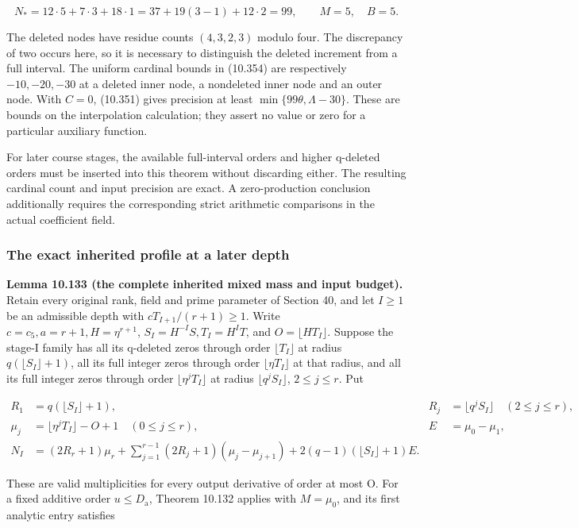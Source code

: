 \documentclass[
  11pt,
  a4paper,
]{article}
\begin{document}
\[
N_*=12\cdot5+7\cdot3+18\cdot1
=37+19(3-1)+12\cdot2=99,\qquad M=5,\quad B=5.
\tag{10.355}
\]

The deleted nodes have residue counts \((4,3,2,3)\) modulo four. The
discrepancy of two occurs here, so it is necessary to distinguish the
deleted increment from a full interval. The uniform cardinal bounds in
(10.354) are respectively \(-10,-20,-30\) at a deleted inner node, a
nondeleted inner node and an outer node. With \(C=0\), (10.351) gives
precision at least \(\min\{99\theta,\Lambda-30\}\). These are bounds on
the interpolation calculation; they assert no value or zero for a
particular auxiliary function.

For later course stages, the available full-interval orders and higher
q-deleted orders must be inserted into this theorem without discarding
either. The resulting cardinal count and input precision are exact. A
zero-production conclusion additionally requires the corresponding
strict arithmetic comparisons in the actual coefficient field.

\subsubsection{The exact inherited profile at a later
depth}\label{the-exact-inherited-profile-at-a-later-depth}

\textbf{Lemma 10.133 (the complete inherited mixed mass and input
budget).} Retain every original rank, field and prime parameter of
Section 40, and let \(I\ge1\) be an admissible depth with
\(cT_{I+1}/(r+1)\ge1\). Write \(c=c_5,a=r+1,H=\eta^{r+1}\),
\(S_I=H^{-I}S,T_I=H^IT\), and \(O=\lfloor HT_I\rfloor\). Suppose the
stage-I family has all its q-deleted zeros through order
\(\lfloor T_I\rfloor\) at radius \(q(\lfloor S_I\rfloor+1)\), all its
full integer zeros through order \(\lfloor\eta T_I\rfloor\) at that
radius, and all its full integer zeros through order
\(\lfloor\eta^jT_I\rfloor\) at radius \(\lfloor q^jS_I\rfloor\),
\(2\le j\le r\). Put

\[
\begin{aligned}
R_1&=q(\lfloor S_I\rfloor+1),&
R_j&=\lfloor q^jS_I\rfloor\quad(2\le j\le r),\\
\mu_j&=\lfloor\eta^jT_I\rfloor-O+1\quad(0\le j\le r),&
E&=\mu_0-\mu_1,\\
N_I&=(2R_r+1)\mu_r+
\sum_{j=1}^{r-1}(2R_j+1)(\mu_j-\mu_{j+1})
+2(q-1)(\lfloor S_I\rfloor+1)E.
\end{aligned}
\tag{10.356}
\]

These are valid multiplicities for every output derivative of order at
most O. For a fixed additive order \(u\le D_{\mathrm a}\), Theorem
10.132 applies with \(M=\mu_0\), and its first analytic entry satisfies
\end{document}
